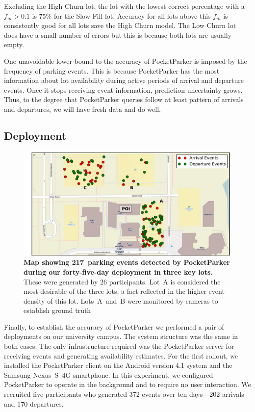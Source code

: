 Excluding the High Churn lot, the lot with the lowest correct percentage with
a $f_m > 0.1$ is 75\% for the Slow Fill lot.  Accuracy for all lots above
this $f_m$ is consistently good for all lots save the High Churn model.  The
Low Churn lot does have a small number of errors but this is because both lots
are usually empty.

One unavoidable lower bound to the accuracy of PocketParker is imposed by the
frequency of parking events.  This is because PocketParker has the most
information about lot availability during active periods of arrival and
departure events. Once it stops receiving event information, prediction
uncertainty grows.  Thus, to the degree that PocketParker queries follow at
least pattern of arrivals and departures, we will have fresh data and do well.

\subsection{Deployment}

\begin{figure}
\centering
\includegraphics[width=\textwidth]{./figures/EventsOnThreeParkingLot.pdf}

\caption{\textbf{Map showing 217~parking events detected by PocketParker
during our forty-five-day deployment in three key lots.}  These were
generated by 26 participants.  Lot~A is considered the most desirable of the
three lots, a fact reflected in the higher event density of this lot.  
Lots~A~and~B were monitored by cameras to establish ground truth}

\label{fig-events}
\end{figure}

Finally, to establish the accuracy of PocketParker we performed a pair of
deployments on our university campus.  The system structure was the same in
both cases:  The only infrastructure required was the PocketParker server for
receiving events and generating availability estimates.  For the first
rollout, we installed the PocketParker client on the Android version 4.1
system and the Samsung Nexus~S~4G smartphone.  In this experiment, we
configured PocketParker to operate in the background and to require no user
interaction.   We recruited five participants who generated 372 events over
ten days---202 arrivals and 170 departures.

